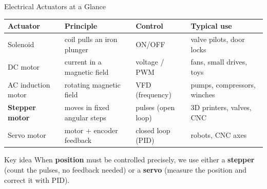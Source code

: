 \documentclass[aspectratio=169]{beamer}
\begin{document}
	\begin{frame}{Electrical Actuators at a Glance}
		\renewcommand{\arraystretch}{1.35}
		\centering
		\small
		\begin{tabular}{@{}p{2.6cm}p{4.2cm}p{2.6cm}p{3.6cm}@{}}
			\toprule
			\textbf{Actuator} & \textbf{Principle} & \textbf{Control} & \textbf{Typical use} \\
			\midrule
			Solenoid          & coil pulls an iron plunger       & ON/OFF        & valve pilots, door locks \\
			DC motor          & current in a magnetic field      & voltage / PWM & fans, small drives, toys \\
			AC induction motor& rotating magnetic field          & VFD (frequency) & pumps, compressors, winches \\
			\textbf{Stepper motor} & moves in fixed angular steps & pulses (open loop) & 3D printers, valves, CNC \\
			Servo motor       & motor + encoder feedback         & closed loop (PID) & robots, CNC axes \\
			\bottomrule
		\end{tabular}
		\vspace{0.4cm}
		\begin{block}{Key idea}
			When \textbf{position} must be controlled precisely, we use either a \textbf{stepper} (count the pulses, no feedback needed) or a \textbf{servo} (measure the position and correct it with PID).
		\end{block}
	\end{frame}

\end{document}
